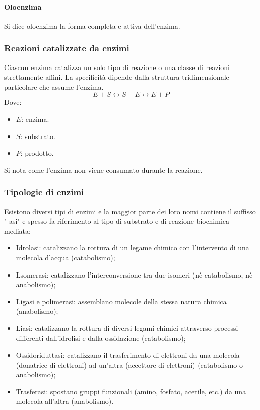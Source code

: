 			\paragraph{Oloenzima}
			Si dice oloenzima la forma completa e attiva dell'enzima.
		
		\subsubsection{Reazioni catalizzate da enzimi}
		Ciascun enzima catalizza un solo tipo di reazione o una classe di reazioni strettamente affini.
		La specificit\`a dipende dalla struttura tridimensionale particolare che assume l'enzima.
		\[E + S \leftrightarrow S-E \leftrightarrow E + P \]
		Dove:
		\begin{multicols}{2}
			\begin{itemize}
				\item $E$: enzima.
				\item $S$: substrato.
				\item $P$: prodotto.
			\end{itemize}
		\end{multicols}
		Si nota come l'enzima non viene consumato durante la reazione.

		\subsubsection{Tipologie di enzimi}
		Esistono diversi tipi di enzimi e la maggior parte dei loro nomi contiene il suffisso "-asi" e spesso fa riferimento al tipo di substrato e di reazione biochimica mediata:
		\begin{multicols}{2}
			\begin{itemize}
	    			\item Idrolasi: catalizzano la rottura di un legame chimico con l'intervento di una molecola d'acqua (catabolismo);
	    			\item Lsomerasi: catalizzano l'interconversione tra due isomeri (n\`e catabolismo, n\`e anabolismo);
	    			\item Ligasi e polimerasi: assemblano molecole della stessa natura chimica (anabolismo);
	    			\item Liasi:  catalizzano la rottura di diversi legami chimici attraverso processi differenti dall'idrolisi e dalla ossidazione (catabolismo);
	    			\item Ossidoriduttasi: catalizzano il trasferimento di elettroni da una molecola (donatrice di elettroni) ad un'altra (accettore di elettroni) (catabolismo o anabolismo);
	    			\item Trasferasi: spostano gruppi funzionali (amino, fosfato, acetile, etc.) da una molecola all'altra (anabolismo).
			\end{itemize}
		\end{multicols}

